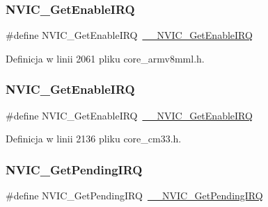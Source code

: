 \subsubsection{\texorpdfstring{N\+V\+I\+C\+\_\+\+Get\+Enable\+I\+RQ}{NVIC\_GetEnableIRQ}\hspace{0.1cm}{\footnotesize\ttfamily [11/12]}}
{\footnotesize\ttfamily \#define N\+V\+I\+C\+\_\+\+Get\+Enable\+I\+RQ~\hyperlink{group___c_m_s_i_s___core___n_v_i_c_functions_gaaeb5e7cc0eaad4e2817272e7bf742083}{\+\_\+\+\_\+\+N\+V\+I\+C\+\_\+\+Get\+Enable\+I\+RQ}}



Definicja w linii 2061 pliku core\+\_\+armv8mml.\+h.

\mbox{\label{group___c_m_s_i_s___core___n_v_i_c_functions_ga857de13232ec65dd15087eaa15bc4a69}} 
\subsubsection{\texorpdfstring{N\+V\+I\+C\+\_\+\+Get\+Enable\+I\+RQ}{NVIC\_GetEnableIRQ}\hspace{0.1cm}{\footnotesize\ttfamily [12/12]}}
{\footnotesize\ttfamily \#define N\+V\+I\+C\+\_\+\+Get\+Enable\+I\+RQ~\hyperlink{group___c_m_s_i_s___core___n_v_i_c_functions_gaaeb5e7cc0eaad4e2817272e7bf742083}{\+\_\+\+\_\+\+N\+V\+I\+C\+\_\+\+Get\+Enable\+I\+RQ}}



Definicja w linii 2136 pliku core\+\_\+cm33.\+h.

\mbox{\label{group___c_m_s_i_s___core___n_v_i_c_functions_gac608957a239466e9e0cbc30aa64feb3b}} 
\subsubsection{\texorpdfstring{N\+V\+I\+C\+\_\+\+Get\+Pending\+I\+RQ}{NVIC\_GetPendingIRQ}\hspace{0.1cm}{\footnotesize\ttfamily [1/12]}}
{\footnotesize\ttfamily \#define N\+V\+I\+C\+\_\+\+Get\+Pending\+I\+RQ~\hyperlink{group___c_m_s_i_s___core___n_v_i_c_functions_ga5a92ca5fa801ad7adb92be7257ab9694}{\+\_\+\+\_\+\+N\+V\+I\+C\+\_\+\+Get\+Pending\+I\+RQ}}



